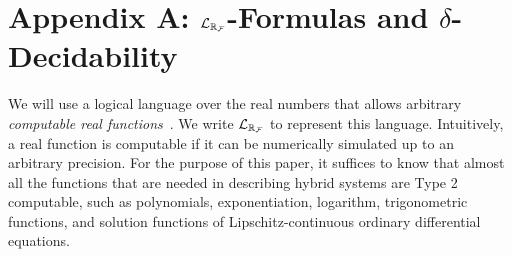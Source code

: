\section*{Appendix A: $\mathcal{L}_{\mathbb{R}_{\mathcal{F}}}$-Formulas and $\delta$-Decidability}

We will use a logical language over the real numbers that allows arbitrary {\em computable real functions}~\cite{CAbook}. We write $\mathcal{L}_{\mathbb{R}_{\mathcal{F}}}$ to represent this language. Intuitively, a real function is computable if it can be numerically simulated up to an arbitrary precision. For the purpose of this paper, it suffices to know that almost all the functions that are needed in describing hybrid systems are Type 2 computable, such as polynomials, exponentiation, logarithm, trigonometric functions, and solution functions of Lipschitz-continuous ordinary differential equations.

